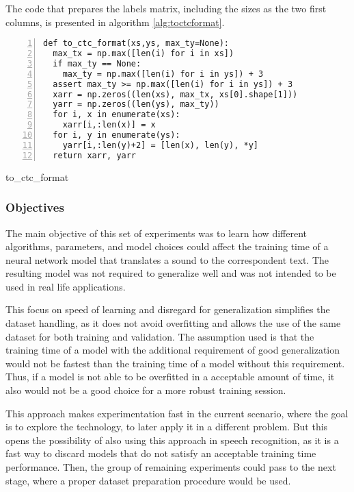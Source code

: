 The code that prepares the labels matrix, including the sizes as the two first columns, is presented in algorithm \ref{alg:toctcformat}.

\noindent
\begin{algorithm}

\begin{lstlisting}[frame=single, numbers=left]
def to_ctc_format(xs,ys, max_ty=None):
  max_tx = np.max([len(i) for i in xs])
  if max_ty == None:
    max_ty = np.max([len(i) for i in ys]) + 3
  assert max_ty >= np.max([len(i) for i in ys]) + 3
  xarr = np.zeros((len(xs), max_tx, xs[0].shape[1]))
  yarr = np.zeros((len(ys), max_ty))
  for i, x in enumerate(xs):
    xarr[i,:len(x)] = x
  for i, y in enumerate(ys):
    yarr[i,:len(y)+2] = [len(x), len(y), *y]
  return xarr, yarr
\end{lstlisting}
\caption{\label{alg:toctcformat}to\_ctc\_format}
\end{algorithm}

\subsubsection{Objectives}
The main objective of this set of experiments was to 
learn how different algorithms, parameters, and model choices could affect the training time of a neural network model that translates a sound to the correspondent text. The resulting model was not required to generalize well and was not intended to be used in real life applications.

This focus on speed of learning and disregard for generalization simplifies the dataset handling, as it does not avoid overfitting and allows the use of the same dataset for both training and validation. The assumption used is that the training time of a model with the additional requirement of good generalization would not be fastest than the training time of a model without this requirement. Thus, if a model is not able to be overfitted in a acceptable amount of time, it also would not be a good choice for a more robust training session.

This approach makes experimentation fast in the current scenario, where the goal is to explore the technology, to later apply it in a different problem. But this opens the possibility of also using this approach in speech recognition, as it is a fast way to discard models that do not satisfy an acceptable training time performance. Then, the group of remaining experiments could pass to the next stage, where a proper dataset preparation procedure would be used.

